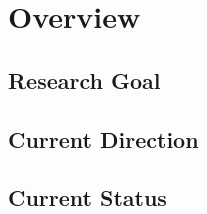 \section{Overview}

\subsection{Research Goal}

\subsection{Current Direction}

\subsection{Current Status}
